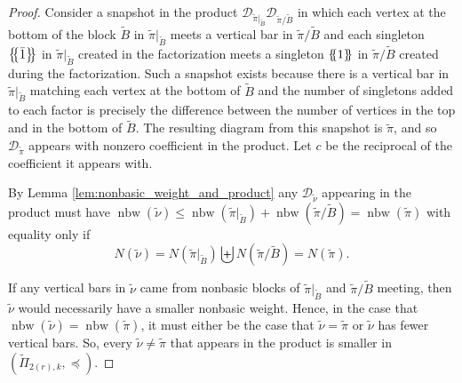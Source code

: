 \documentclass[ALCO,Unicode,published]{cedram}
\newcommand{\DD}{\mathcal{D}}
\newcommand{\tpi}{{\tilde{\pi}}}
\newcommand{\tnu}{{\tilde{\nu}}}
\newcommand{\tB}{{\tilde{B}}}
\newcommand{\multi}[1]{\left\{\mskip-5mu\left\{#1\right\}\mskip-5mu\right\}}
\newcommand{\ov}[1]{\bar{#1}}
\DeclareMathOperator{\nbw}{nbw}
\begin{document}
\begin{proof}

    Consider a snapshot in the product $\DD_{\tpi|_{\tB}}\DD_{\tpi/\tB}$ in which each vertex at the bottom of the block $\tB$ in $\tpi|_{\tB}$ meets a vertical bar in $\tpi/\tB$ and each singleton $\multi{\ov1}$ in $\tpi|_{\tB}$ created in the factorization meets a singleton $\multi{1}$ in $\tpi/\tB$ created during the factorization. Such a snapshot exists because there is a vertical bar in $\tpi|_{\tB}$ matching each vertex at the bottom of $\tB$ and the number of singletons added to each factor is precisely the difference between the number of vertices in the top and in the bottom of $\tB$. The resulting diagram from this snapshot is $\tpi$, and so $\DD_\tpi$ appears with nonzero coefficient in the product. Let $c$ be the reciprocal of the coefficient it appears with.

    By Lemma \ref{lem:nonbasic_weight_and_product} any $\DD_\tnu$ appearing in the product must have $\nbw(\tnu)\leq\nbw(\tpi|_{\tB})+\nbw(\tpi/\tB)=\nbw(\tpi)$ with equality only if \[N(\tnu)=N(\tpi|_{\tB})\biguplus N(\tpi/\tB)=N(\tpi).\]

    If any vertical bars in $\tnu$ came from nonbasic blocks of $\tpi|_{\tB}$ and $\tpi/\tB$ meeting, then $\tnu$ would necessarily have a smaller nonbasic weight. Hence, in the case that $\nbw(\tnu)=\nbw(\tpi)$, it must either be the case that $\tnu=\tpi$ or $\tnu$ has fewer vertical bars. So, every $\tnu\neq\tpi$ that appears in the product is smaller in $(\tilde\Pi_{2(r),k},\preceq)$.
\end{proof}
\end{document}
